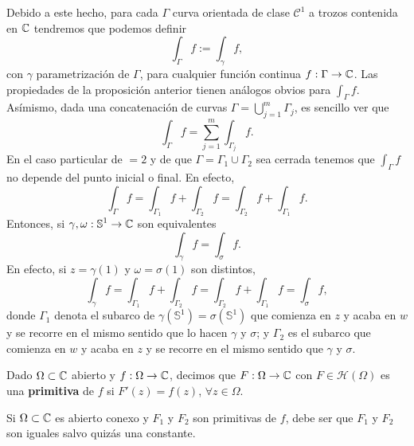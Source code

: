Debido a este hecho, para cada $\displaystyle \Gamma $ curva orientada de clase $\displaystyle \mathcal{C}^{1} $ a trozos contenida en $\displaystyle \mathbb{C} $ tendremos que podemos definir
	\[\int _{\Gamma}f := \int _{\gamma }f ,\]
con $\displaystyle \gamma  $ parametrización de $\displaystyle \Gamma  $, para cualquier función continua $\displaystyle f : \Gamma \to \mathbb{C} $. Las propiedades de la proposición anterior tienen análogos obvios para $\displaystyle \int _{\Gamma }f $. 
Asímismo, dada una concatenación de curvas $\displaystyle \Gamma = \bigcup^{m}_{j = 1}\Gamma_{j} $, es sencillo ver que
\[\int _{\Gamma}f = \sum^{m}_{j =1}\int _{\Gamma_{j}}f .\]
En el caso particular de $\displaystyle  = 2 $ y de que $\displaystyle \Gamma = \Gamma_{1} \cup\Gamma_{2} $ sea cerrada tenemos que $\displaystyle \int _{\Gamma }f  $ no depende del punto inicial o final. En efecto,
\[\int _{\Gamma }f =\int _{\Gamma_{1}}f +\int _{\Gamma_{2}}f =  \int _{\Gamma_{2}}f +\int _{\Gamma_{1}}f  .\]
Entonces, si $\displaystyle \gamma, \omega : \mathbb{S}^{1} \to \mathbb{C} $ son equivalentes 
\[\int _{\gamma }f =\int _{\sigma } f .\]
En efecto, si $\displaystyle z = \gamma\left(1\right) $ y $\displaystyle \omega = \sigma\left(1\right) $ son distintos, 
\[\int _{\gamma }f =\int _{\Gamma_{1}}f +\int _{\Gamma_{2}}f =\int _{\Gamma_{2}}f +\int _{\Gamma_{1}}f =\int _{\sigma }f ,\]
donde $\displaystyle \Gamma_{1} $ denota el subarco de $\displaystyle \gamma\left(\mathbb{S}^{1}\right)=\sigma\left(\mathbb{S}^{1}\right) $ que comienza en $\displaystyle z $ y acaba en $\displaystyle w $ y se recorre en el mismo sentido que lo hacen $\displaystyle \gamma  $ y $\displaystyle \sigma  $; y $\displaystyle \Gamma_{2} $ es el subarco que comienza en $\displaystyle w $ y acaba en $\displaystyle z $ y se recorre en el mismo sentido que $\displaystyle \gamma  $ y $\displaystyle \sigma  $. 
\begin{definition}
Dado $\displaystyle \Omega \subset \mathbb{C} $ abierto y $\displaystyle f : \Omega \to \mathbb{C} $, decimos que $\displaystyle F : \Omega \to \mathbb{C} $ con $\displaystyle F \in \mathcal{H}\left(\Omega \right) $ es una \textbf{primitiva} de $\displaystyle f$ si $\displaystyle F'\left(z\right)=f\left(z\right) $, $\displaystyle \forall z \in \Omega  $. 
\end{definition}
\begin{observation}
Si $\displaystyle \Omega \subset \mathbb{C} $ es abierto conexo y $\displaystyle F_{1} $ y $\displaystyle F_{2} $ son primitivas de $\displaystyle f $, debe ser que $\displaystyle F_{1} $ y $\displaystyle F_{2} $ son iguales salvo quizás una constante.  
\end{observation}
